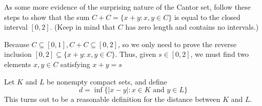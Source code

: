 \begin{solution}
  \enum{
  \item \TODO
  \item \TODO
  \item \TODO
  }
\end{solution}

\begin{exercise}
  As some more evidence of the surprising nature of the Cantor set, follow these steps to show that the sum $C+C=\{x+y: x, y \in C\}$ is equal to the closed interval $[0,2]$. (Keep in mind that $C$ has zero length and contains no intervals.)

  Because $C \subseteq[0,1], C+C \subseteq[0,2]$, so we only need to prove the reverse inclusion $[0,2] \subseteq\{x+y: x, y \in C\}$. Thus, given $s \in[0,2]$, we must find two elements $x, y \in C$ satisfying $x+y=s$
\end{exercise}

\begin{solution}
  \enum{
  \item \TODO
  \item \TODO
  }
\end{solution}

\begin{exercise}
  Let $K$ and $L$ be nonempty compact sets, and define
  $$
  d=\inf \{|x-y|: x \in K \text { and } y \in L\}
  $$
  This turns out to be a reasonable definition for the distance between $K$ and $L$.
\end{exercise}

\begin{solution}
  \enum{
  \item \TODO
  \item \TODO
  }
\end{solution}


